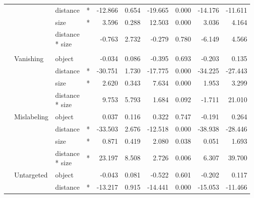 \documentclass[
]{article}
\begin{document}
\begin{longtable}[t]{llllrrrrrr}
\cmidrule{3-10}\nopagebreak
\hspace{1em} &  & distance & * & -12.866 & 0.654 & -19.665 & 0.000 & -14.176 & -11.611\\
\cmidrule{3-10}\nopagebreak
\hspace{1em} &  & size & * & 3.596 & 0.288 & 12.503 & 0.000 & 3.036 & 4.164\\
\cmidrule{3-10}\nopagebreak
\hspace{1em} &  & distance * size &  & -0.763 & 2.732 & -0.279 & 0.780 & -6.149 & 4.566\\
\cmidrule{1-10}\pagebreak[0]
\addlinespace[0.3em]
\multicolumn{10}{l}{\textbf{RetinaNet}}\\
\hspace{1em} & Vanishing & object &  & -0.034 & 0.086 & -0.395 & 0.693 & -0.203 & 0.135\\
\cmidrule{3-10}\nopagebreak
\hspace{1em} &  & distance & * & -30.751 & 1.730 & -17.775 & 0.000 & -34.225 & -27.443\\
\cmidrule{3-10}\nopagebreak
\hspace{1em} &  & size & * & 2.620 & 0.343 & 7.634 & 0.000 & 1.953 & 3.299\\
\cmidrule{3-10}\nopagebreak
\hspace{1em} &  & distance * size &  & 9.753 & 5.793 & 1.684 & 0.092 & -1.711 & 21.010\\
\cmidrule{2-10}\nopagebreak
\hspace{1em} & Mislabeling & object &  & 0.037 & 0.116 & 0.322 & 0.747 & -0.191 & 0.264\\
\cmidrule{3-10}\nopagebreak
\hspace{1em} &  & distance & * & -33.503 & 2.676 & -12.518 & 0.000 & -38.938 & -28.446\\
\cmidrule{3-10}\nopagebreak
\hspace{1em} &  & size & * & 0.871 & 0.419 & 2.080 & 0.038 & 0.051 & 1.693\\
\cmidrule{3-10}\nopagebreak
\hspace{1em} &  & distance * size & * & 23.197 & 8.508 & 2.726 & 0.006 & 6.307 & 39.700\\
\cmidrule{2-10}\nopagebreak
\hspace{1em} & Untargeted & object &  & -0.043 & 0.081 & -0.522 & 0.601 & -0.202 & 0.117\\
\cmidrule{3-10}\nopagebreak
\hspace{1em} &  & distance & * & -13.217 & 0.915 & -14.441 & 0.000 & -15.053 & -11.466\\

\end{longtable}
\end{document}
